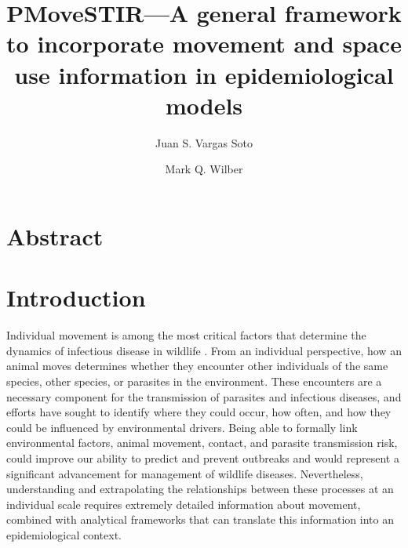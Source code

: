 \documentclass[letterpaper]{article}
\title{PMoveSTIR---A general framework to incorporate movement and space use information in epidemiological models}
\author{Juan S. Vargas Soto \and Mark Q. Wilber}
\affil{School of Natural Resources, University of Tennessee, Knoxville, TN}
\date{}
\begin{document}
\maketitle

\section*{Abstract}

\section*{Introduction}

Individual movement is among the most critical factors that determine the dynamics of infectious disease in wildlife \citep{Manlove2022,Dougherty2022}. 
From an individual perspective, how an animal moves determines whether they encounter other individuals of the same species, other species, or parasites in the environment. 
These encounters are a necessary component for the transmission of parasites and infectious diseases, and efforts have sought to identify where they could occur, how often, and how they could be influenced by environmental drivers. 
Being able to formally link environmental factors, animal movement, contact, and parasite transmission risk, could improve our ability to predict and prevent outbreaks and would represent a significant advancement for management of wildlife diseases.  
Nevertheless, understanding and extrapolating the relationships between these processes at an individual scale requires extremely detailed information about movement, combined with analytical frameworks that can translate this information into an epidemiological context.
\end{document}

